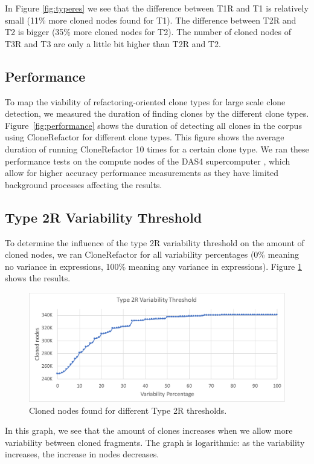 In Figure \ref{fig:typeres} we see that the difference between T1R and T1 is relatively small (11\% more cloned nodes found for T1). The difference between T2R and T2 is bigger (35\% more cloned nodes for T2). The number of cloned nodes of T3R and T3 are only a little bit higher than T2R and T2.

\subsection{Performance}
To map the viability of refactoring-oriented clone types for large scale clone detection, we measured the duration of finding clones by the different clone types. Figure~\ref{fig:performance} shows the duration of detecting all clones in the corpus using CloneRefactor for different clone types. This figure shows the average duration of running CloneRefactor 10 times for a certain clone type. We ran these performance tests on the compute nodes of the DAS4 supercomputer \cite{bal2016medium}, which allow for higher accuracy performance measurements as they have limited background processes affecting the results.

\subsection{Type 2R Variability Threshold}
To determine the influence of the type 2R variability threshold on the amount of cloned nodes, we ran CloneRefactor for all variability percentages (0\% meaning no variance in expressions, 100\% meaning any variance in expressions). Figure \ref{fig:t2rgraph} shows the results.

\begin{figure}[H]
  \includegraphics[width=1\textwidth]{img/T2R}
  \caption{Cloned nodes found for different Type 2R thresholds.}
  \label{fig:t2rgraph}
\end{figure}

In this graph, we see that the amount of clones increases when we allow more variability between cloned fragments. The graph is logarithmic: as the variability increases, the increase in nodes decreases.

